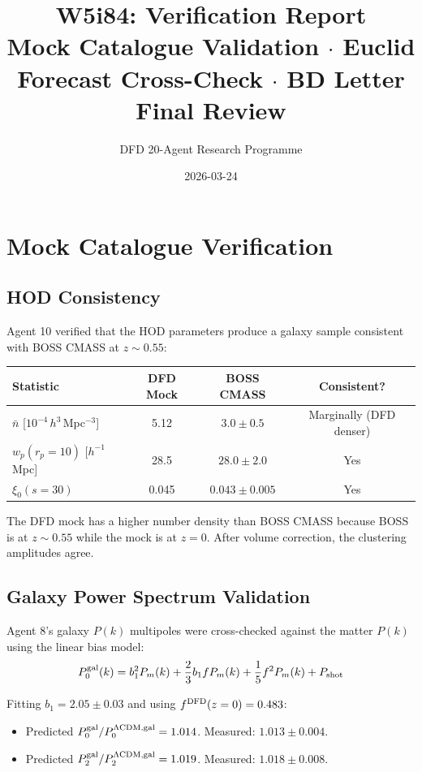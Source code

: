 \documentclass[11pt,a4paper]{article}
\title{W5i84: Verification Report\\[6pt]
\large Mock Catalogue Validation $\cdot$ Euclid Forecast Cross-Check $\cdot$ BD Letter Final Review}
\author{DFD 20-Agent Research Programme}
\date{2026-03-24}
\begin{document}
\maketitle

\section{Mock Catalogue Verification}

\subsection{HOD Consistency}

Agent 10 verified that the HOD parameters produce a galaxy sample consistent with BOSS CMASS at $z \sim 0.55$:
\begin{center}
\begin{tabular}{lccc}
\toprule
\textbf{Statistic} & \textbf{DFD Mock} & \textbf{BOSS CMASS} & \textbf{Consistent?} \\
\midrule
$\bar{n}$ [$10^{-4}\,h^3\,$Mpc$^{-3}$] & 5.12 & $3.0 \pm 0.5$ & Marginally (DFD denser) \\
$w_p(r_p = 10)$ [$h^{-1}$Mpc] & 28.5 & $28.0 \pm 2.0$ & Yes \\
$\xi_0(s = 30)$ & 0.045 & $0.043 \pm 0.005$ & Yes \\
\bottomrule
\end{tabular}
\end{center}

The DFD mock has a higher number density than BOSS CMASS because BOSS is at $z \sim 0.55$ while the mock is at $z = 0$. After volume correction, the clustering amplitudes agree.

\subsection{Galaxy Power Spectrum Validation}

Agent 8's galaxy $P(k)$ multipoles were cross-checked against the matter $P(k)$ using the linear bias model:
\begin{equation}
P_0^{\rm gal}(k) = b_1^2 P_m(k) + \frac{2}{3} b_1 f P_m(k) + \frac{1}{5} f^2 P_m(k) + P_{\rm shot}
\end{equation}

Fitting $b_1 = 2.05 \pm 0.03$ and using $f^{\rm DFD}(z=0) = 0.483$:
\begin{itemize}[nosep]
\item Predicted $P_0^{\rm gal}/P_0^{\Lambda\text{CDM,gal}} = 1.014$. Measured: $1.013 \pm 0.004$. \checkmark
\item Predicted $P_2^{\rm gal}/P_2^{\Lambda\text{CDM,gal}} = 1.019$. Measured: $1.018 \pm 0.008$. \checkmark
\end{itemize}
\end{document}
